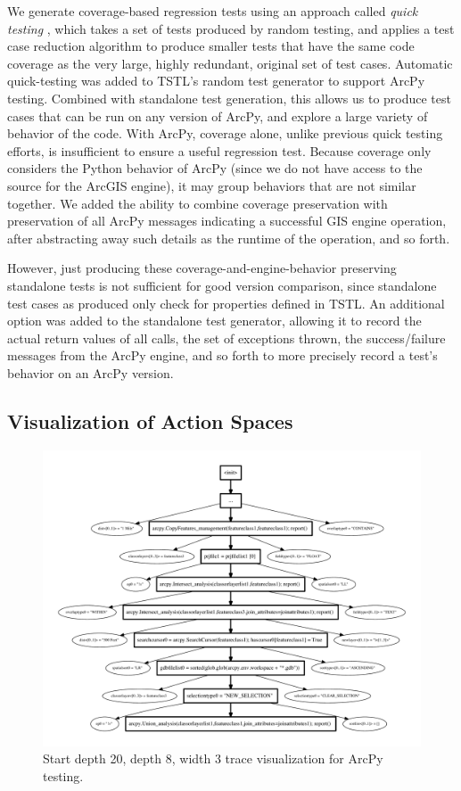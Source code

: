 We generate coverage-based regression tests using an approach called \emph{quick
  testing} \cite{icst14,stvrcausereduce}, which takes a set of tests
produced by random testing, and applies a test case reduction
algorithm \cite{DD} to produce smaller tests that have the same code
coverage as the very large, highly redundant, original set of test
cases.  Automatic quick-testing was added to TSTL's random test
generator to support ArcPy testing.  Combined with standalone test
generation, this allows us to produce test cases that can be run on
any version of ArcPy, and explore a large variety of behavior of the
code.  With ArcPy, coverage alone, unlike previous quick testing
efforts, is insufficient to ensure a useful regression test.  Because
coverage only considers the Python behavior of ArcPy (since we do not
have access to the source for the ArcGIS engine), it may group
behaviors that are not similar together.  We added the ability to
combine coverage preservation with preservation of all ArcPy messages
indicating a successful GIS engine operation, after abstracting away
such details as the runtime of the operation, and so forth.

However, just producing these coverage-and-engine-behavior preserving
standalone tests is not sufficient for good version comparison, since
standalone test cases as produced only check for properties defined in TSTL.  An
additional option was added to the standalone test generator, allowing
it to record the actual return values of all calls, the set of
exceptions thrown, the success/failure messages from the ArcPy engine, and so forth to more precisely record a test's
behavior on an ArcPy version.


\subsection{Visualization of Action Spaces}

\begin{figure}
\includegraphics[width=\columnwidth]{shortgraph}
\caption{Start depth 20, depth 8, width 3 trace visualization for ArcPy testing.}
\label{fig:actions}
\end{figure}

